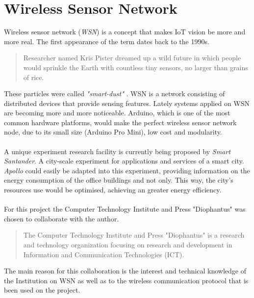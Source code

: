 \documentclass[12pt,a4paper]{report}
\begin{document}
\section{Wireless Sensor Network}
%
Wireless sensor network (\textit{WSN}) is a concept that makes IoT vision be more and more real. The first appearance of the term dates back to the 1990s.
\begin{quote}
    Researcher named Kris Pister dreamed up a wild future in which people would sprinkle the Earth with countless tiny sensors, no larger than grains of rice.
\end{quote} 
These particles were called \textit{"smart-dust"} \cite{website:smartdust}. WSN is a network consisting of distributed devices that provide sensing features. Lately systems applied on WSN are becoming more and more noticeable. Arduino, which is one of the most common hardware platforms, would make the perfect wireless sensor network node, due to its small size (Arduino Pro Mini), low cost and modularity.\\
\ \\
A unique experiment research facility is currently being proposed by \textit{Smart Santander}. A city-scale experiment for applications and services of a smart city. \emph{Apollo} could easily be adapted into this experiment, providing information on the energy consumption of the office buildings and not only. This way, the city's resources use would be optimised, achieving an greater energy efficiency.\\
\ \\
%
For this project the Computer Technology Institute and Press "Diophantus" was chosen to collaborate with the author.
%
\begin{quote}The Computer Technology Institute and Press "Diophantus" is a research and technology organization focusing on research and development in Information and Communication Technologies (ICT)\cite{website:cti}. \end{quote}
%
The main reason for this collaboration is the interest and technical knowledge of the Institution on WSN as well as to the wireless communication protocol that is been used on the project.
%
\newpage
%
\end{document}
